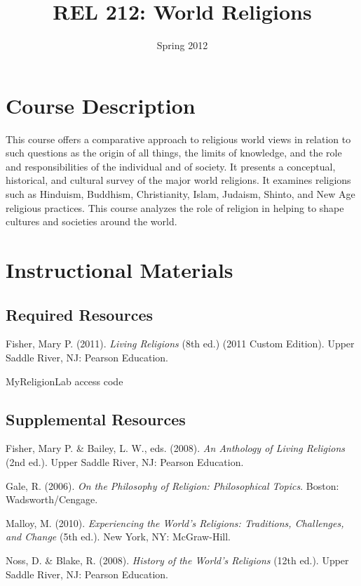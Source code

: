 \documentclass{article}
\title{REL 212: World Religions}
\date{Spring 2012}
\begin{document}
\maketitle


\section*{Course Description}
This course offers a comparative approach to religious world views in relation to such questions as the origin of all things, the limits of knowledge, and the role and responsibilities of the individual and of society. It presents a conceptual, historical, and cultural survey of the major world religions. It examines religions such as Hinduism, Buddhism, Christianity, Islam, Judaism, Shinto, and New Age religious practices. This course analyzes the role of religion in helping to shape cultures and societies around the world.

\section*{Instructional Materials}
\subsection*{Required Resources}
\begin{itemize*}
	\item Fisher, Mary P. (2011). \emph{Living Religions} (8th ed.) (2011 Custom Edition). Upper Saddle River, NJ: Pearson Education.
	\item MyReligionLab access code
\end{itemize*}

\subsection*{Supplemental Resources}
\begin{itemize*}
	\item Fisher, Mary P. \& Bailey, L. W., eds. (2008). \emph{An Anthology of Living Religions} (2nd ed.).  Upper Saddle River, NJ: Pearson Education.
	\item Gale, R. (2006). \emph{On the Philosophy of Religion: Philosophical Topics}. Boston: Wadsworth/Cengage.
	\item Malloy, M. (2010). \emph{Experiencing the World's Religions: Traditions, Challenges, and Change} (5th ed.). New York, NY: McGraw-Hill.
	\item Noss, D. \& Blake, R. (2008). \emph{History of the World's Religions} (12th ed.). Upper Saddle River, NJ:  Pearson Education.  
\end{itemize*}
\end{document}

